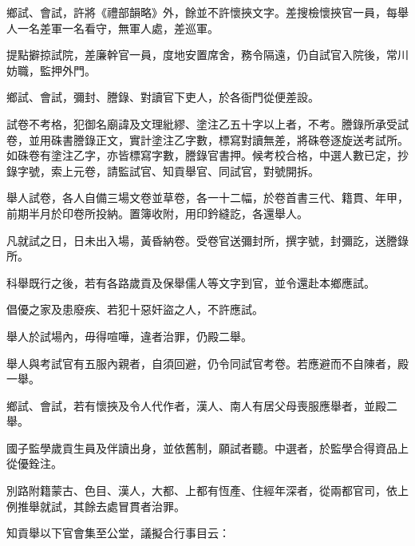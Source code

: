 \begin{pinyinscope}
 鄉試、會試，許將《禮部韻略》外，餘並不許懷挾文字。差搜檢懷挾官一員，每舉人一名差軍一名看守，無軍人處，差巡軍。



 提點擗掠試院，差廉幹官一員，度地安置席舍，務令隔遠，仍自試官入院後，常川妨職，監押外門。



 鄉試、會試，彌封、謄錄、對讀官下吏人，於各衙門從便差設。



 試卷不考格，犯御名廟諱及文理紕繆、塗注乙五十字以上者，不考。謄錄所承受試卷，並用硃書謄錄正文，實計塗注乙字數，標寫對讀無差，將硃卷逐旋送考試所。如硃卷有塗注乙字，亦皆標寫字數，謄錄官書押。候考校合格，中選人數已定，抄錄字號，索上元卷，請監試官、知貢舉官、同試官，對號開拆。



 舉人試卷，各人自備三場文卷並草卷，各一十二幅，於卷首書三代、籍貫、年甲，前期半月於印卷所投納。置簿收附，用印鈐縫訖，各還舉人。



 凡就試之日，日未出入場，黃昏納卷。受卷官送彌封所，撰字號，封彌訖，送謄錄所。



 科舉既行之後，若有各路歲貢及保舉儒人等文字到官，並令還赴本鄉應試。



 倡優之家及患廢疾、若犯十惡奸盜之人，不許應試。



 舉人於試場內，毋得喧嘩，違者治罪，仍殿二舉。



 舉人與考試官有五服內親者，自須回避，仍令同試官考卷。若應避而不自陳者，殿一舉。



 鄉試、會試，若有懷挾及令人代作者，漢人、南人有居父母喪服應舉者，並殿二舉。



 國子監學歲貢生員及伴讀出身，並依舊制，願試者聽。中選者，於監學合得資品上從優銓注。



 別路附籍蒙古、色目、漢人，大都、上都有恆產、住經年深者，從兩都官司，依上例推舉就試，其餘去處冒貫者治罪。



 知貢舉以下官會集至公堂，議擬合行事目云：




\end{pinyinscope}
